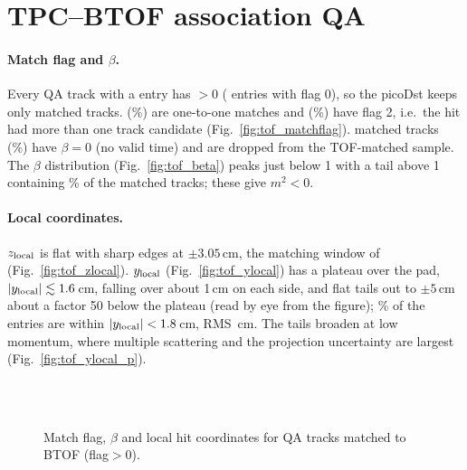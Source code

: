 \section{TPC--BTOF association QA}
\label{sec:tofqa}

\paragraph{Match flag and $\beta$.} Every QA track with a  entry has
$>0$ (\nFlagZero{} entries with flag 0), so the picoDst keeps only matched tracks.
\nFlagOne{} (\fracFlagOne\%) are one-to-one matches and \nFlagTwo{} (\fracFlagTwo\%) have flag 2,
i.e.\ the hit had more than one track candidate (Fig.~\ref{fig:tof_matchflag}).
\nBetaLost{} matched tracks (\fracBetaLost\%) have $\beta=0$ (no valid time) and are dropped from the
TOF-matched sample. The $\beta$ distribution (Fig.~\ref{fig:tof_beta}) peaks just below 1 with a tail
above 1 containing \fracBetaGtOne\% of the matched tracks; these give $m^2<0$.

\paragraph{Local coordinates.} $z_{\rm local}$ is flat with sharp edges at $\pm3.05$\,cm, the matching window
of  (Fig.~\ref{fig:tof_zlocal}). $y_{\rm local}$ (Fig.~\ref{fig:tof_ylocal}) has a plateau
over the pad, $|y_{\rm local}|\lesssim1.6$\,cm, falling over about 1\,cm on each side, and flat tails out to
$\pm5$\,cm about a factor 50 below the plateau (read by eye from the figure); \fracYLocalIn\% of the entries are within
$|y_{\rm local}|<1.8$\,cm, RMS \rmsYLocal\,cm. The tails broaden at low momentum, where multiple
scattering and the projection uncertainty are largest (Fig.~\ref{fig:tof_ylocal_p}).

\begin{figure}[H]
\centering
{}
\hfill
{}
\hfill
{}
\\[1ex]
\hfill
{}
\hfill
{}
\\[1ex]
\caption{Match flag, $\beta$ and local hit coordinates for QA tracks matched to BTOF (flag$>0$).}
\end{figure}

